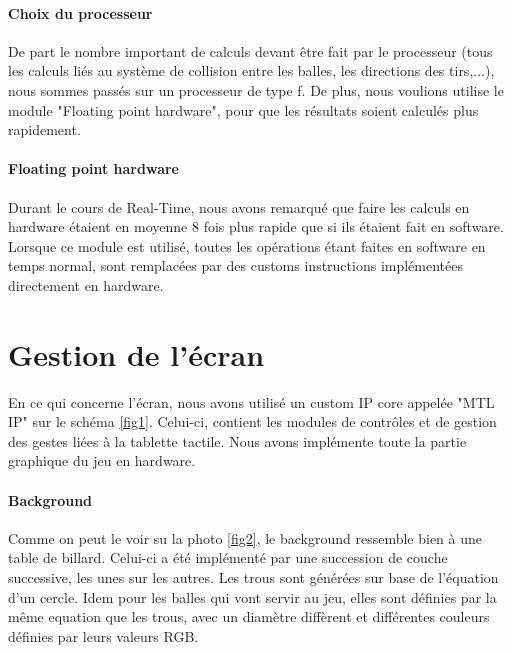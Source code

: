 \paragraph{Choix du processeur}

De part le nombre important de calculs devant être fait par le processeur (tous les calculs liés au système de collision entre les balles, les directions des tirs,...), nous sommes passés sur un processeur de type f. De plus, nous voulions utilise le module "Floating point hardware", pour que les résultats soient calculés plus rapidement.

\paragraph{Floating point hardware}

Durant le cours de Real-Time, nous avons remarqué que faire les calculs en hardware étaient en moyenne 8 fois plus rapide que si ils étaient fait en software. Lorsque ce module est utilisé, toutes les opérations étant faites en software en temps normal, sont remplacées par des customs instructions implémentées directement en hardware.

\section{Gestion de l'écran}
En ce qui concerne l'écran, nous avons utilisé un custom IP core appelée "MTL IP" sur le schéma \ref{fig1}. Celui-ci, contient les modules de contrôles et de gestion des gestes liées à la tablette tactile. Nous avons implémente toute la partie graphique du jeu en hardware.

\paragraph{Background}
Comme on peut le voir su la photo \ref{fig2}, le background ressemble bien à une  table de billard. Celui-ci a été implémenté par une succession de couche successive, les unes sur les autres. Les trous sont générées sur base de l'équation d'un cercle. Idem pour les balles qui vont servir au jeu, elles sont définies par la même equation que les trous, avec un diamètre diffèrent et différentes couleurs définies par leurs valeurs RGB.

